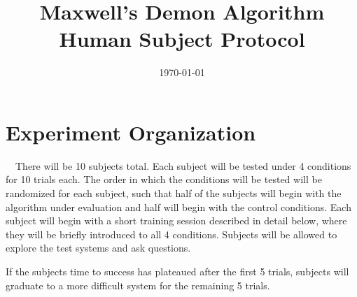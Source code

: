 \documentclass[11pt]{article}
\begin{document}
\title{Maxwell's Demon Algorithm Human Subject Protocol}
\author{}
\date{\today}
\maketitle
\section{Experiment Organization}

\	\	There will be 10 subjects total. Each subject will be tested under 4 conditions for 10 trials each. The order in which the conditions will be tested will be randomized for each subject, such that half of the subjects will begin with the algorithm under evaluation and half will begin with the control conditions. Each subject will begin with a short training session described in detail below, where they will be briefly introduced to all 4 conditions. Subjects will be allowed to explore the test systems and ask questions.

If the subjects time to success has plateaued after the first 5 trials, subjects will graduate to a more difficult system for the remaining 5 trials.
\end{document}
